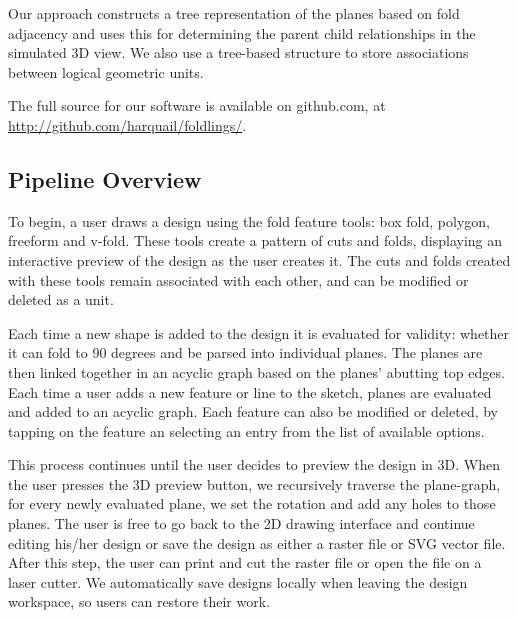 Our approach constructs a tree representation of the planes based on
fold adjacency and uses this for determining the parent child
relationships in the simulated 3D view. We also use a tree-based
structure to store associations between logical geometric units.

The full source for our software is available on github.com, at
\url{http://github.com/harquail/foldlings/}.

\subsection{Pipeline Overview}\label{pipeline-overview}

To begin, a user draws a design using the fold feature tools: box fold,
polygon, freeform and v-fold. These tools create a pattern of cuts and
folds, displaying an interactive preview of the design as the user
creates it. The cuts and folds created with these tools remain
associated with each other, and can be modified or deleted as a unit.

Each time a new shape is added to the design it is evaluated for
validity: whether it can fold to 90 degrees and be parsed into
individual planes. The planes are then linked together in an acyclic
graph based on the planes' abutting top edges. Each time a user adds a
new feature or line to the sketch, planes are evaluated and added to an
acyclic graph. Each feature can also be modified or deleted, by tapping
on the feature an selecting an entry from the list of available options.

This process continues until the user decides to preview the design in
3D. When the user presses the 3D preview button, we recursively traverse
the plane-graph, for every newly evaluated plane, we set the rotation
and add any holes to those planes. The user is free to go back to the 2D
drawing interface and continue editing his/her design or save the design
as either a raster file or SVG vector file. After this step, the user
can print and cut the raster file or open the file on a laser cutter. We
automatically save designs locally when leaving the design workspace, so
users can restore their work.

